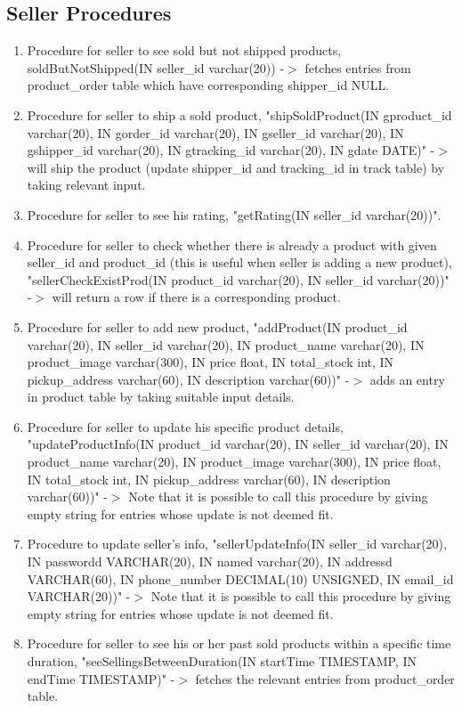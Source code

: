 \documentclass[a4paper,12pt]{article}
\begin{document}
\subsection{Seller Procedures}
\begin{enumerate}
  \item Procedure for seller to see sold but not shipped products, soldButNotShipped(IN seller\_id varchar(20)) -$>$ fetches entries from product\_order table which have corresponding shipper\_id NULL.
  \item Procedure for seller to ship a sold product, "shipSoldProduct(IN gproduct\_id varchar(20), IN gorder\_id varchar(20), IN gseller\_id varchar(20), IN gshipper\_id varchar(20), IN gtracking\_id varchar(20), IN gdate DATE)" -$>$ will ship the product (update shipper\_id and tracking\_id in track table) by taking relevant input.
  \item Procedure for seller to see his rating, "getRating(IN seller\_id varchar(20))".
  \item Procedure for seller to check whether there is already a product with given seller\_id and product\_id (this is useful when seller is adding a new product), "sellerCheckExistProd(IN product\_id varchar(20), IN seller\_id varchar(20))" -$>$ will return a row if there is a corresponding product.
  \item Procedure for seller to add new product, "addProduct(IN product\_id varchar(20), IN seller\_id varchar(20), IN product\_name varchar(20), IN product\_image varchar(300), IN price float, IN total\_stock int, IN pickup\_address varchar(60), IN description varchar(60))" -$>$ adds an entry in product table by taking suitable input details.
  \item Procedure for seller to update his specific product details, "updateProductInfo(IN product\_id varchar(20), IN seller\_id varchar(20), IN product\_name varchar(20), IN product\_image varchar(300), IN price float, IN total\_stock int, IN pickup\_address varchar(60), IN description varchar(60))" -$>$ Note that it is possible to call this procedure by giving empty string for entries whose update is not deemed fit.
  \item Procedure to update seller's info, "sellerUpdateInfo(IN seller\_id varchar(20), IN passwordd VARCHAR(20), IN named varchar(20), IN addressd VARCHAR(60), IN phone\_number DECIMAL(10) UNSIGNED, IN email\_id VARCHAR(20))" -$>$ Note that it is possible to call this procedure by giving empty string for entries whose update is not deemed fit.
  \item Procedure for seller to see his or her past sold products within a specific time duration, "seeSellingsBetweenDuration(IN startTime TIMESTAMP, IN endTime TIMESTAMP)" -$>$ fetches the relevant entries from product\_order table.

\end{enumerate}
\end{document}
